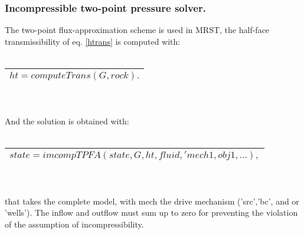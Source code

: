 \documentclass[12pt]{report}
\begin{document}
\subsubsection{Incompressible two-point pressure solver.}
The two-point flux-approximation scheme is used in MRST, the half-face transmissibility of
eq. \eqref{htrans} is computed with:\\\\
\begin{tabular}{|l|}
\hline
 $ht=computeTrans(G,rock).$\\
\hline
\end{tabular}
\\\\And the solution is obtained with:
\\\\
\begin{tabular}{|l|}
\hline
 $state=imcompTPFA(state,G,ht,fluid,'mech1,obj1,...),$\\
\hline
\end{tabular}
\\\\that takes the complete model, with mech the drive mechanism ('src','bc', and or 'wells').
The inflow and outflow must sum up to zero for preventing the violation of the assumption of incompressibility.






\end{document}
